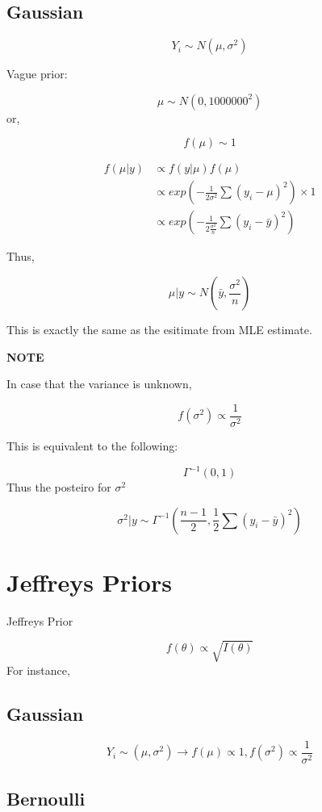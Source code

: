 \documentclass[]{book}
\begin{document}
\hypertarget{gaussian}{%
\subsection{Gaussian}\label{gaussian}}

\[Y_i \sim N(\mu, \sigma^2)\]

Vague prior:

\[\mu \sim N(0, 1000000^2)\]
or,

\[f(\mu) \sim 1\]

\[\begin{aligned} f(\mu | y) &\propto f(y|\mu)f(\mu) \\ &\propto exp(-\frac{1}{2 \sigma^2} \sum (y_i-\mu)^2) \times 1 \\ &\propto exp(-\frac{1}{2 \frac{\sigma^2}{n}} \sum (y_i-\bar{y})^2) \end{aligned}\]

Thus,

\[\mu | y \sim N(\bar{y}, \frac{\sigma^2}{n})\]

This is exactly the same as the esitimate from MLE estimate.

\textbf{NOTE}

In case that the variance is unknown,

\[f(\sigma^2) \propto \frac{1}{\sigma^2}\]

This is equivalent to the following:

\[\Gamma ^{-1}(0,1)\]
Thus the posteiro for \(\sigma^2\)

\[\sigma^2|y \sim \Gamma ^{-1} (\frac{n-1}{2},\frac{1}{2} \sum (y_i-\bar{y})^2)\]

\hypertarget{jeffreys-priors}{%
\section{Jeffreys Priors}\label{jeffreys-priors}}

Jeffreys Prior

\[f(\theta) \propto \sqrt{I(\theta)}\]
For instance,

\hypertarget{gaussian-1}{%
\subsection{Gaussian}\label{gaussian-1}}

\[Y_i \sim (\mu, \sigma^2) \rightarrow f(\mu) \propto 1, f(\sigma^2)\propto \frac{1}{\sigma^2}\]

\hypertarget{bernoulli-1}{%
\subsection{Bernoulli}\label{bernoulli-1}}
\end{document}
